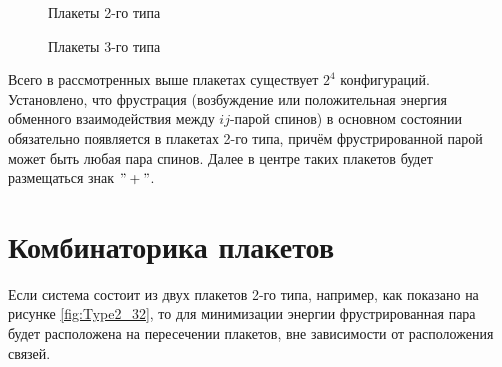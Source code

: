 \documentclass[utf8, babel, sor, jor, amsmath, amssymb, reprint]{elsarticle} %
\begin{document}
\begin{figure}[H]
\begin{minipage}{0.3\textwidth}
		\caption{Плакеты 2-го типа}
		\label{fig:Type2}
	\end{minipage}
	\hspace{5pt}
	\begin{minipage}{0.3\textwidth}
		\centering
		\hspace{-4pt} 
		\caption{Плакеты 3-го типа}
		\label{fig:Type3}
	\end{minipage}
\end{figure}


Всего в рассмотренных выше плакетах существует $2^4$ конфигураций.
Установлено, что фрустрация (возбуждение или положительная энергия обменного взаимодействия между $ij$-парой спинов) в основном состоянии обязательно появляется в плакетах 2-го типа, причём фрустрированной парой может быть любая пара спинов. Далее в центре таких плакетов будет размещаться знак $"+"$.

\section{Комбинаторика плакетов}

Если система состоит из двух плакетов 2-го типа, например, как показано на рисунке \ref{fig:Type2_32}, то для минимизации энергии фрустрированная пара будет расположена на пересечении плакетов, вне зависимости от расположения связей. 
\end{document}
